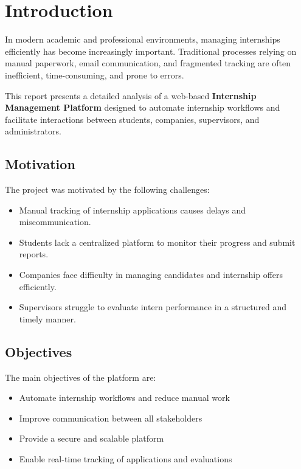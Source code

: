 \documentclass[11pt,a4paper]{article}
\begin{document}
\tableofcontents
\newpage

\section{Introduction}

In modern academic and professional environments, managing internships efficiently has become increasingly important. Traditional processes relying on manual paperwork, email communication, and fragmented tracking are often inefficient, time-consuming, and prone to errors.

This report presents a detailed analysis of a web-based \textbf{Internship Management Platform} designed to automate internship workflows and facilitate interactions between students, companies, supervisors, and administrators.

\subsection{Motivation}

The project was motivated by the following challenges:
\begin{itemize}
    \item Manual tracking of internship applications causes delays and miscommunication.
    \item Students lack a centralized platform to monitor their progress and submit reports.
    \item Companies face difficulty in managing candidates and internship offers efficiently.
    \item Supervisors struggle to evaluate intern performance in a structured and timely manner.
\end{itemize}

\subsection{Objectives}

The main objectives of the platform are:
\begin{itemize}
    \item Automate internship workflows and reduce manual work
    \item Improve communication between all stakeholders
    \item Provide a secure and scalable platform
    \item Enable real-time tracking of applications and evaluations
\end{itemize}
\end{document}
